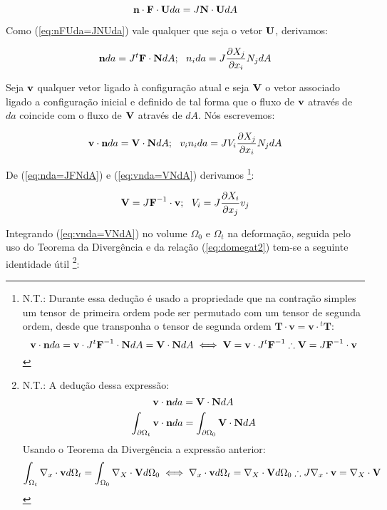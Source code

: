 \documentclass[
	11pt, %
	fleqn, %
	a4paper, %
]{LegrandOrangeBook}
\begin{document}
\begin{equation}
	\label{eq:nFUda=JNUda}	
	\textbf{n} \cdot \textbf{F} \cdot \textbf{U} da = J \textbf{N} \cdot \textbf{U} dA
\end{equation}

Como (\ref{eq:nFUda=JNUda}) vale qualquer que seja o vetor $\textbf{U}$, derivamos:

\begin{equation}
	\label{eq:nda=JFNdA}	
	\textbf{n} da = J {}^t\textbf{F} \cdot \textbf{N} dA; ~~ n_ida = J \dfrac{\partial X_j}{\partial x_i}N_jdA
\end{equation}

Seja $\textbf{v}$ qualquer vetor ligado à configuração atual e seja $\textbf{V}$ o vetor associado ligado a configuração inicial e definido de tal forma que o fluxo de $\textbf{v}$ através de $da$ coincide com o fluxo de $\textbf{V}$ através de $dA$. Nós escrevemos:

\begin{equation}
	\label{eq:vnda=VNdA}	
	\textbf{v} \cdot \textbf{n} da = \textbf{V} \cdot \textbf{N} dA;~~ v_in_ida = JV_i\dfrac{\partial X_j}{\partial x_i}N_jdA
\end{equation}

De (\ref{eq:nda=JFNdA}) e (\ref{eq:vnda=VNdA}) derivamos \footnote{N.T.: Durante essa dedução é usado a propriedade que na contração simples um tensor de primeira ordem pode ser permutado com um tensor de segunda ordem, desde que transponha o tensor de segunda ordem $\textbf{T} \cdot \textbf{v} = \textbf{v} \cdot {}^t\textbf{T}$:
	\begin{displaymath}	
	\textbf{v} \cdot \textbf{n} da = \textbf{v} \cdot J {}^t \textbf{F}^{-1} \cdot \textbf{N} dA = \textbf{V} \cdot \textbf{N} dA \iff \textbf{V} = \textbf{v} \cdot J {}^t \textbf{F}^{-1} \therefore  \textbf{V} = J \textbf{F}^{-1} \cdot \textbf{v}
	\end{displaymath}

}:

\begin{equation}
	\label{eq:V=JF-1}	
\textbf{V} = J \textbf{F}^{-1} \cdot \textbf{v}; ~~ V_i = J \dfrac{\partial X_i}{\partial x_j}v_j
\end{equation}

Integrando (\ref{eq:vnda=VNdA}) no volume $\Omega_0$ e $\Omega_t$ na deformação, seguida pelo uso do Teorema da Divergência e da relação (\ref{eq:domegat2}) tem-se a seguinte identidade útil \footnote{N.T.: A dedução dessa expressão:
	\begin{displaymath}	
		\textbf{v} \cdot \textbf{n} da = \textbf{V} \cdot \textbf{N} dA
	\end{displaymath}
	\begin{displaymath}	
	\int_{\partial \Omega_t}^{}\textbf{v} \cdot \textbf{n} da = \int_{\partial \Omega_0}^{}\textbf{V} \cdot \textbf{N} dA
	\end{displaymath}
	Usando o Teorema da Divergência a expressão anterior:
	\begin{displaymath}	
	\int_{\Omega_t}^{}\nabla_x \cdot \textbf{v} d\Omega_t = \int_{ \Omega_0}^{} \nabla_X \cdot \textbf{V} d\Omega_0 \iff \nabla_x \cdot \textbf{v} d\Omega_t = \nabla_X \cdot \textbf{V} d\Omega_0 \therefore J \nabla_x \cdot \textbf{v} = \nabla_X \cdot \textbf{V}
	\end{displaymath}

}:
\end{document}
